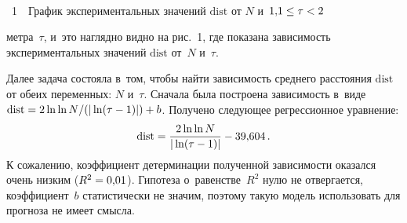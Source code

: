 \begin{multicols}{2}
{ \begin{center}  %
 \vspace*{-2pt}
    \mbox{%
\epsfxsize=78.504mm
}

\end{center}



\noindent
{{\figurename~1}\ \ \small{График экспериментальных
значений $\mathrm{dist}$ от $N$ и~$1{,}1\hm\leq\tau\hm<2$
}}}

\vspace*{8pt}

\addtocounter{figure}{1}
\addtocounter{table}{1}



\noindent
мет\-ра~$\tau$,
 и~это  на\-гляд\-но видно
на рис.~1, где показана за\-ви\-си\-мость
экспериментальных значений $\mathrm{dist}$ от~$N$ и~$\tau$.


Далее задача состояла в~том, чтобы найти за\-ви\-си\-мость сред\-не\-го рас\-сто\-яния $\mathrm{dist}$ от обеих переменных:
$N$ и~$\tau$.
Сначала была построена за\-ви\-си\-мость в~виде $\mathrm{dist}\hm={2\ln\ln N}/({|\ln(\tau-1)|})\hm+b$. Получено
сле\-ду\-ющее регрессионное уравнение:
\begin{equation*}
\mathrm{dist} = \displaystyle\frac{\displaystyle 2\ln\ln N\mathstrut}{\displaystyle |\ln(\tau-1)|\mathstrut}-39{,}604\,.
\end{equation*}
К сожалению, коэффициент детерминации полученной за\-ви\-си\-мости оказался очень низ\-ким
($R^2\hm=0{,}01$). Гипотеза о~равенстве~$R^2$ нулю не отвергается, коэффициент~$b$
статистически не значим, поэтому такую модель использовать для прогноза не имеет смысла.




\end{multicols}

